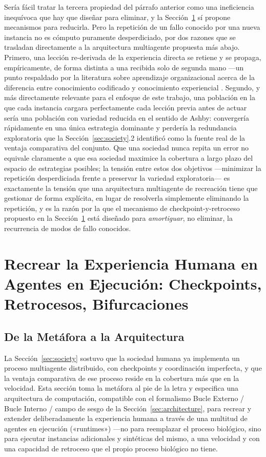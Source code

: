 \documentclass[11pt]{article}
\begin{document}
Sería fácil tratar la tercera propiedad del párrafo anterior como una ineficiencia inequívoca que hay que diseñar para eliminar, y la Sección~\ref{sec:recreation} sí propone mecanismos para reducirla. Pero la repetición de un fallo conocido por una nueva instancia no es cómputo puramente desperdiciado, por dos razones que se trasladan directamente a la arquitectura multiagente propuesta más abajo. Primero, una lección re-derivada de la experiencia directa se retiene y se propaga, empíricamente, de forma distinta a una recibida solo de segunda mano —un punto respaldado por la literatura sobre aprendizaje organizacional acerca de la diferencia entre conocimiento codificado y conocimiento experiencial \citep{argyris1978organizational}. Segundo, y más directamente relevante para el enfoque de este trabajo, una población en la que cada instancia cargara perfectamente cada lección previa antes de actuar sería una población con variedad reducida en el sentido de Ashby: convergería rápidamente en una única estrategia dominante y perdería la redundancia exploratoria que la Sección~\ref{sec:society}.2 identificó como la fuente real de la ventaja comparativa del conjunto. Que una sociedad nunca repita un error no equivale claramente a que esa sociedad maximice la cobertura a largo plazo del espacio de estrategias posibles; la tensión entre estos dos objetivos —minimizar la repetición desperdiciada frente a preservar la variedad exploratoria— es exactamente la tensión que una arquitectura multiagente de recreación tiene que gestionar de forma explícita, en lugar de resolverla simplemente eliminando la repetición, y es la razón por la que el mecanismo de checkpoint-y-retroceso propuesto en la Sección~\ref{sec:recreation} está diseñado para \emph{amortiguar}, no eliminar, la recurrencia de modos de fallo conocidos.

\section{Recrear la Experiencia Humana en Agentes en Ejecución: Checkpoints, Retrocesos, Bifurcaciones}
\label{sec:recreation}

\subsection{De la Metáfora a la Arquitectura}

La Sección~\ref{sec:society} sostuvo que la sociedad humana ya implementa un proceso multiagente distribuido, con checkpoints y coordinación imperfecta, y que la ventaja comparativa de ese proceso reside en la cobertura más que en la velocidad. Esta sección toma la metáfora al pie de la letra y especifica una arquitectura de computación, compatible con el formalismo Bucle Externo / Bucle Interno / campo de sesgo de la Sección~\ref{sec:architecture}, para recrear y extender deliberadamente la experiencia humana a través de una multitud de agentes en ejecución («runtimes») —no para reemplazar el proceso biológico, sino para ejecutar instancias adicionales y sintéticas del mismo, a una velocidad y con una capacidad de retroceso que el propio proceso biológico no tiene.
\end{document}
